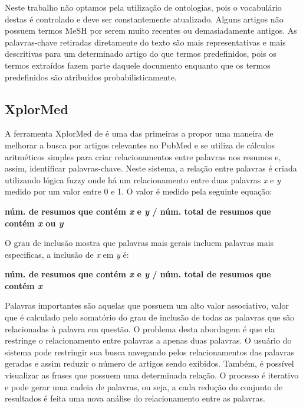 Neste trabalho não optamos pela utilização de ontologias, pois o vocabulário destas é controlado e deve ser constantemente atualizado. Alguns artigos não possuem termos MeSH por serem muito recentes ou demasiadamente antigos. As palavras-chave retiradas diretamente do texto são mais representativas e mais descritivas para um determinado artigo do que termos predefinidos, pois os termos extraídos fazem parte daquele documento enquanto que os termos predefinidos são atribuídos probabilisticamente.

\subsection{XplorMed}
A ferramenta XplorMed de \cite{Perez-Iratxeta2001} é uma das primeiras a propor uma maneira de melhorar a busca por artigos relevantes no PubMed e se utiliza de cálculos aritméticos simples para criar relacionamentos entre palavras nos resumos e, assim, identificar palavras-chave. Neste sistema, a relação entre palavras é criada utilizando lógica fuzzy onde há um relacionamento entre duas palavras \emph{x} e \emph{y} medido por um valor entre 0 e 1. O valor é medido pela seguinte equação:

\begin{centering}
\textbf{
núm. de resumos que contém \emph{x} e \emph{y} / núm. total de resumos que contém \emph{x} ou \emph{y}
}
\end{centering}

O grau de inclusão mostra que palavras mais gerais incluem palavras mais especificas, a inclusão de \emph{x} em \emph{y} é:

\begin{centering}
\textbf{
núm. de resumos que contém \emph{x} e \emph{y} / núm. total de resumos que contém \emph{x}
}
\end{centering}

Palavras importantes são aquelas que possuem um alto valor associativo, valor que é calculado pelo somatório do grau de inclusão de todas as palavras que são relacionadas à palavra em questão. O problema desta abordagem é que ela restringe o relacionamento entre palavras a apenas duas palavras. O usuário do sistema pode restringir sua busca navegando pelos relacionamentos das palavras geradas e assim reduzir o número de artigos sendo exibidos. Também, é possível visualizar as frases que possuem uma determinada relação. O processo é iterativo e pode gerar uma cadeia de palavras, ou seja, a cada redução do conjunto de resultados é feita uma nova análise do relacionamento entre as palavras.

